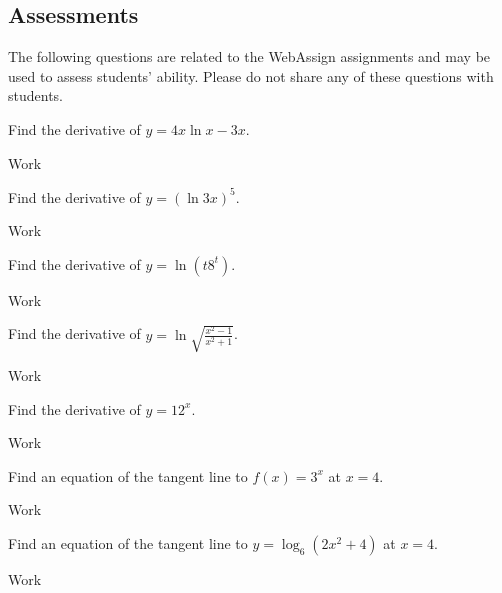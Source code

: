 \documentclass[12pt,addpoints, answers, fleqn]{exam}
\begin{document}
\begin{teacher}
\subsection{Assessments}
The following questions are related to the WebAssign assignments and may be used to assess students' ability. Please do not share any of these questions with students.
\begin{questions}	
\question 	%

Find the derivative of $y = 4x \ln x  - 3x$.
\begin{solution}
Work
\end{solution}


\question 	%

Find the derivative of $y = \left( \ln 3x \right)^5$.
\begin{solution}
Work
\end{solution}

\question 	%

Find the derivative of $y = \ln \left( t 8^t \right)$.
\begin{solution}
Work
\end{solution}


\question 	%

Find the derivative of $y = \ln \sqrt{\displaystyle \frac{x^2-1}{x^2+1}}$.
\begin{solution}
Work
\end{solution}

\question 	%

Find the derivative of $y = 12^x$.
\begin{solution}
Work
\end{solution}

\question 	%

Find an equation of the tangent line to $f\left( x \right) = 3^x$ at $x = 4$.
 \begin{solution}
Work
\end{solution}

\question 	%

Find an equation of the tangent line to $y = \log_6 \left( 2x^2 + 4\right)$ at $x = 4$.
 \begin{solution}
Work
\end{solution}


\end{questions}
\end{teacher}
\end{document}
